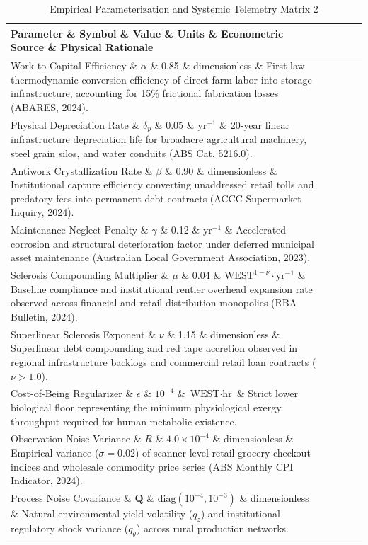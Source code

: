 \documentclass[preprint,12pt,authoryear]{elsarticle}
\theoremstyle{definition}
\begin{document}
\begin{table}[htbp]
\centering
\small
\begin{tabular}{lcccp{}}
\toprule
\textbf{Parameter} \& \textbf{Symbol} \& \textbf{Value} \& \textbf{Units} \& \textbf{Econometric Source \& Physical Rationale} \\
\midrule
Work-to-Capital Efficiency \& $\alpha$ \& 0.85 \& dimensionless \& First-law thermodynamic conversion efficiency of direct farm labor into storage infrastructure, accounting for 15\% frictional fabrication losses (ABARES, 2024). \\
Physical Depreciation Rate \& $\delta_p$ \& 0.05 \& $\text{yr}^{-1}$ \& 20-year linear infrastructure depreciation life for broadacre agricultural machinery, steel grain silos, and water conduits (ABS Cat. 5216.0). \\
Antiwork Crystallization Rate \& $\beta$ \& 0.90 \& dimensionless \& Institutional capture efficiency converting unaddressed retail tolls and predatory fees into permanent debt contracts (ACCC Supermarket Inquiry, 2024). \\
Maintenance Neglect Penalty \& $\gamma$ \& 0.12 \& $\text{yr}^{-1}$ \& Accelerated corrosion and structural deterioration factor under deferred municipal asset maintenance (Australian Local Government Association, 2023). \\
Sclerosis Compounding Multiplier \& $\mu$ \& 0.04 \& $\text{WEST}^{1-\nu} \cdot \text{yr}^{-1}$ \& Baseline compliance and institutional rentier overhead expansion rate observed across financial and retail distribution monopolies (RBA Bulletin, 2024). \\
Superlinear Sclerosis Exponent \& $\nu$ \& 1.15 \& dimensionless \& Superlinear debt compounding and red tape accretion observed in regional infrastructure backlogs and commercial retail loan contracts ($\nu > 1.0$). \\
Cost-of-Being Regularizer \& $\epsilon$ \& $10^{-4}$ \& $\text{WEST}\cdot\text{hr}$ \& Strict lower biological floor representing the minimum physiological exergy throughput required for human metabolic existence. \\
Observation Noise Variance \& $R$ \& $4.0 \times 10^{-4}$ \& dimensionless \& Empirical variance ($\sigma = 0.02$) of scanner-level retail grocery checkout indices and wholesale commodity price series (ABS Monthly CPI Indicator, 2024). \\
Process Noise Covariance \& $\mathbf{Q}$ \& $\text{diag}(10^{-4}, 10^{-3})$ \& dimensionless \& Natural environmental yield volatility ($q_z$) and institutional regulatory shock variance ($q_\theta$) across rural production networks. \\
\bottomrule
\end{tabular}
\caption{Empirical Parameterization and Systemic Telemetry Matrix 2}
\label{tab:matrix_2}
\end{table}
\end{document}
